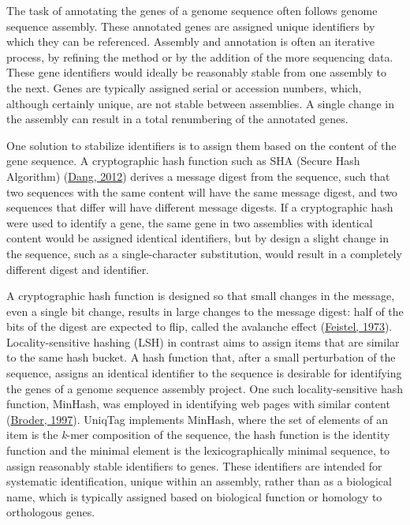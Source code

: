 \documentclass{bioinfo}
\begin{document}
The task of annotating the genes of a genome sequence often follows
genome sequence assembly. These annotated genes are assigned unique
identifiers by which they can be referenced. Assembly and annotation is
often an iterative process, by refining the method or by the addition of
the more sequencing data. These gene identifiers would ideally be
reasonably stable from one assembly to the next. Genes are typically
assigned serial or accession numbers, which, although certainly unique,
are not stable between assemblies. A single change in the assembly can
result in a total renumbering of the annotated genes.

One solution to stabilize identifiers is to assign them based on the
content of the gene sequence. A cryptographic hash function such as SHA
(Secure Hash Algorithm)
(\href{http://www.nist.gov/manuscript-publication-search.cfm?pub_id=910977}{Dang,
2012}) derives a message digest from the sequence, such that two
sequences with the same content will have the same message digest, and
two sequences that differ will have different message digests. If a
cryptographic hash were used to identify a gene, the same gene in two
assemblies with identical content would be assigned identical
identifiers, but by design a slight change in the sequence, such as a
single-character substitution, would result in a completely different
digest and identifier.

A cryptographic hash function is designed so that small changes in the
message, even a single bit change, results in large changes to the
message digest: half of the bits of the digest are expected to flip,
called the avalanche effect
(\href{http://www.scientificamerican.com/article/cryptography-and-computer-privacy/}{Feistel,
1973}). Locality-sensitive hashing (LSH) in contrast aims to assign
items that are similar to the same hash bucket. A hash function that,
after a small perturbation of the sequence, assigns an identical
identifier to the sequence is desirable for identifying the genes of a
genome sequence assembly project. One such locality-sensitive hash
function, MinHash, was employed in identifying web pages with similar
content (\href{http://dx.doi.org/10.1109/SEQUEN.1997.666900}{Broder,
1997}). UniqTag implements MinHash, where the set of elements of an item
is the \emph{k}-mer composition of the sequence, the hash function is
the identity function and the minimal element is the lexicographically
minimal sequence, to assign reasonably stable identifiers to genes.
These identifiers are intended for systematic identification, unique
within an assembly, rather than as a biological name, which is typically
assigned based on biological function or homology to orthologous genes.
\end{document}
